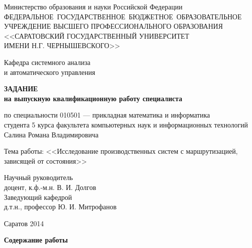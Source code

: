 \documentclass[a4paper,14pt]{extarticle}
\begin{document}
\begin{center}
\singlespacing
Министерство образования и науки Российской Федерации\\
\medskip
\mbox{ФЕДЕРАЛЬНОЕ ГОСУДАРСТВЕННОЕ БЮДЖЕТНОЕ ОБРАЗОВАТЕЛЬНОЕ}\\
УЧРЕЖДЕНИЕ ВЫСШЕГО ПРОФЕССИОНАЛЬНОГО ОБРАЗОВАНИЯ\\
<<САРАТОВСКИЙ ГОСУДАРСТВЕННЫЙ УНИВЕРСИТЕТ\\
ИМЕНИ Н.Г. ЧЕРНЫШЕВСКОГО>>
\end{center}

\vspace{0.5cm}
\begin{flushright}
\parbox{6.8cm}{
\raggedright
  Кафедра системного анализа \\ и автоматического управления
}
\end{flushright}

\vspace{1cm}
\begin{center}
\textbf{ЗАДАНИЕ}\\
\textbf{на выпускную квалификационную работу специалиста}
\end{center}

\begin{flushleft}
по специальности 010501 --- прикладная математика и информатика\\
студента 5 курса факультета компьютерных наук и информационных технологий\\
Салина Романа Владимировича
\medskip

Тема работы: <<Исследование производственных систем с маршрутизацией, зависящей от состояния>>
\end{flushleft}

\vfill

\noindent
\begin{flushleft}
Научный руководитель\\
доцент, к.ф.-м.н. \hfill В. И. Долгов\\
\vspace{10mm}
Заведующий кафедрой\\
д.т.н., профессор \hfill Ю. И. Митрофанов
\end{flushleft}

\vfill

\begin{center}
Саратов 2014
\end{center}

\clearpage
\centerline{\textbf{Содержание работы}}
\end{document}
